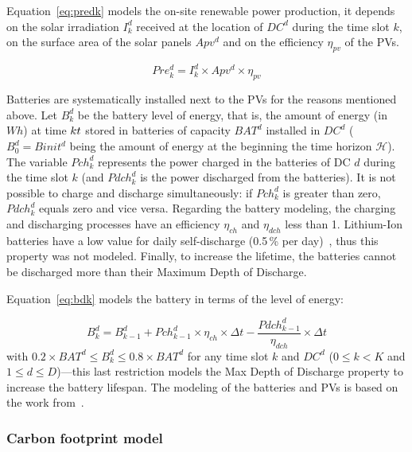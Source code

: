 Equation~\eqref{eq:predk} models the on-site renewable power production,  it depends on the solar irradiation $I^d_k$ received at the location of $DC^d$ during the time slot $k$, on the surface area of the solar panels $Apv^d$ and on the efficiency $\eta_{pv}$ of the PVs. 

\begin{equation} \label{eq:predk}
    Pre^d_{k}= I^d_k \times Apv^d \times \eta_{pv}
\end{equation}


Batteries are systematically installed next to the PVs for the reasons mentioned above. Let $B^d_k$ be the battery level of energy, that is, the amount of energy (in $Wh$) at time $k\time\Delta t$ stored in batteries of capacity $BAT^d$ installed in $DC^d$ ($B^d_0 = Binit^d$ being the amount of energy at the beginning the time horizon $\mathcal{H}$). The variable $Pch_k^d$ represents the power charged in the batteries of DC $d$ during the time slot $k$ (and $Pdch_k^d$ is the power discharged from the batteries). It is not possible to charge and discharge simultaneously: if $Pch^d_k$ is greater than zero, $Pdch^d_k$ equals zero and vice versa. Regarding the battery modeling, the charging and discharging processes have an efficiency $\eta_{ch}$ and $\eta_{dch}$ less than 1. Lithium-Ion batteries have a low value for daily self-discharge (0.5\,\% per day)~\cite{wang2012_EDCS}, thus this property was not modeled. Finally, to increase the lifetime, the batteries cannot be discharged more than their Maximum Depth of Discharge.

Equation~\eqref{eq:bdk} models the battery in terms of the level of energy:

\begin{equation} \label{eq:bdk}
  B^d_k = B^d_{k-1}  + Pch^d_{k-1} \times \eta_{ch} \times \Delta{t} - \frac{Pdch^d_{k-1}}{\eta_{dch}} \times \Delta{t}
\end{equation}
with $0.2\times BAT^d \leq B^d_k\leq 0.8\times BAT^d$ for any time slot $k$ and $DC^d$ ($0\leq k<K$ and $1\leq d\leq D$)---this last restriction models the Max Depth of Discharge property to increase the battery lifespan. The modeling of the batteries and PVs is based on the work from~\citet{2021NICOD_ILP}.


\subsubsection{Carbon footprint model} \label{sec:footprintmodel_ccgrid}



